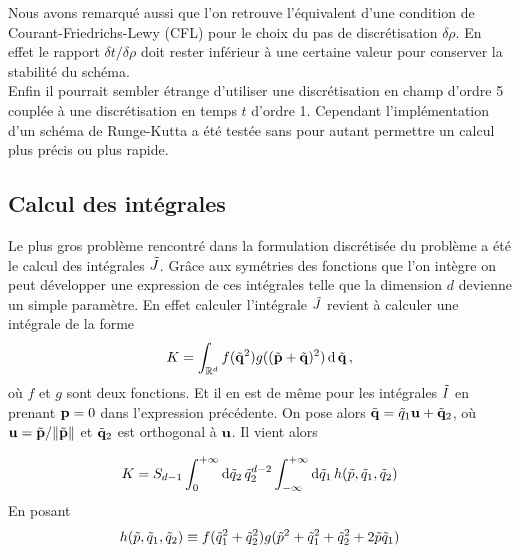 \documentclass[10.5pt]{article}
\begin{document}
\begin{multicols*}{2}
Nous avons remarqué aussi que l'on retrouve l'équivalent d'une condition de Courant-Friedrichs-Lewy (CFL) \cite{courant1967partial} pour le choix du pas de discrétisation $\delta \rho$. En effet le rapport $\delta t / \delta\rho$ doit rester inférieur à une certaine valeur pour conserver la stabilité du schéma.\\

Enfin il pourrait sembler étrange d'utiliser une discrétisation en champ d'ordre 5 couplée à une discrétisation en temps $t$ d'ordre 1. Cependant l'implémentation d'un schéma de Runge-Kutta a été testée sans pour autant permettre un calcul plus précis ou plus rapide. 




\subsection{Calcul des intégrales}

Le plus gros problème rencontré dans la formulation discrétisée du problème a été le calcul des intégrales $\tilde{J}$. 
Grâce aux symétries des fonctions que l'on intègre on peut développer une expression de ces intégrales telle que la dimension $d$ devienne un simple paramètre. En effet calculer l'intégrale $\tilde{J}$ revient à calculer une intégrale de la forme 
\begin{equation}
K = \int_{\mathbb{R}^d} f(\tilde{{\bf q}}^2)g((\tilde{{\bf p}}+\tilde{{\bf q}})^2) \, \text{d} \, \tilde{{\bf q}} \, ,
\end{equation}
où $f$ et $g$ sont deux fonctions. Et il en est de même pour les intégrales $\tilde{I}$ en prenant ${\bf p} = 0$ dans l'expression précédente. On pose alors $\tilde{{\bf q}} = \tilde{q}_1 {\bf u} + \tilde{{\bf q}}_2$, où ${\bf u} = \tilde{{\bf p}}/\|\tilde{{\bf p}}\|$ et $\tilde{{\bf q}}_2$ est orthogonal à ${\bf u}$. Il vient alors

\begin{equation}
K = S_{d-1} \int_0^{+\infty} \text{d}\tilde{q}_2 \, \tilde{q}_2^{d-2} \int_{-\infty}^{+\infty} \text{d}\tilde{q}_1 \, h (\tilde{p}, \tilde{q}_1, \tilde{q}_2)
\end{equation}
En posant
\begin{equation}
h (\tilde{p}, \tilde{q}_1, \tilde{q}_2) \equiv f(\tilde{q}_1^2 + \tilde{q}_2^2) g(\tilde{p}^2 + \tilde{q}_1^2 + \tilde{q}_2^2 + 2\tilde{p}\tilde{q}_1)
\end{equation}


\end{multicols*}
\end{document}

